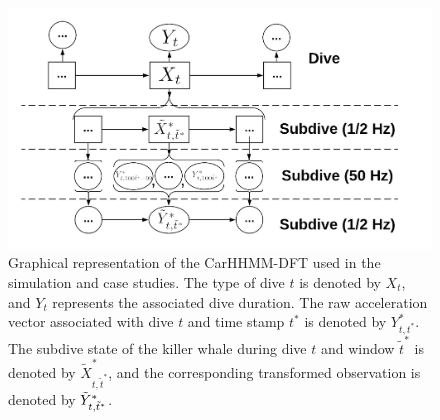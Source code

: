 \begin{figure}[ht]
	\centering
	\includegraphics[width=5in]{../Plots/CarHHMM-DFT.png}
	\caption{Graphical representation of the CarHHMM-DFT used in the simulation and case studies. The type of dive $t$ is denoted by $X_t$, and $Y_t$ represents the associated dive duration. The raw acceleration vector associated with dive $t$ and time stamp $t^*$ is denoted by $Y^*_{t,t^*}$. The subdive state of the killer whale during dive $t$ and window $\tilde t^*$ is denoted by $\tilde X^*_{t,\tilde t^*}$, and the corresponding transformed observation is denoted by $\tilde{Y}^*_{t,\tilde t^*}$.}
	\label{fig:CarHHMM-DFT}
\end{figure}

